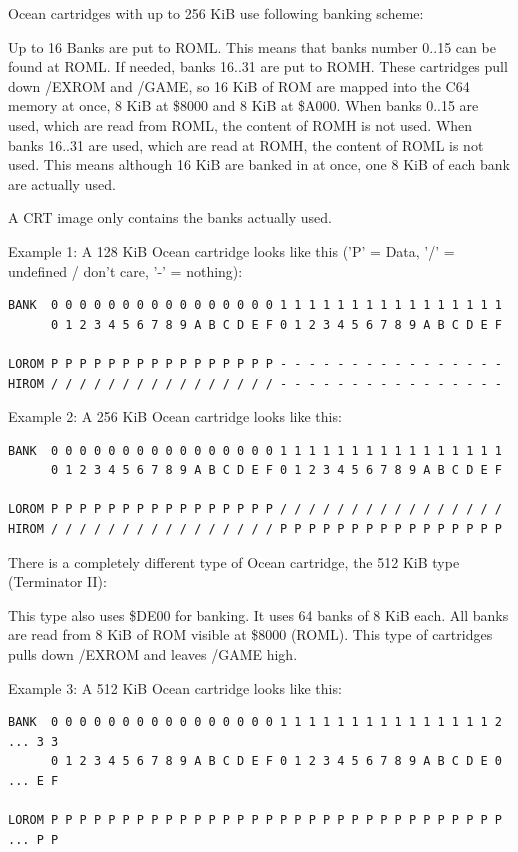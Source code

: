 \documentclass[a4paper,oneside]{memoir}
\begin{document}
Ocean cartridges with up to 256 KiB use following banking scheme:

Up to 16 Banks are put to ROML. This means that banks number 0..15 can be found
at ROML. If needed, banks 16..31 are put to ROMH. These cartridges pull down
/EXROM and /GAME, so 16 KiB of ROM are mapped into the C64 memory at once, 8
KiB at \$8000 and 8 KiB at \$A000.
When banks 0..15 are used, which are read from ROML, the content of ROMH is not
used. When banks 16..31 are used, which are read at ROMH, the content of ROML
is not used. This means although 16 KiB are banked in at once, one 8 KiB of
each bank are actually used.

A CRT image only contains the banks actually used.

Example 1: A 128 KiB Ocean cartridge looks like this ('P' = Data, '/' =
undefined / don't care, '-' = nothing):

\small
\begin{verbatim}
BANK  0 0 0 0 0 0 0 0 0 0 0 0 0 0 0 0 1 1 1 1 1 1 1 1 1 1 1 1 1 1 1 1
      0 1 2 3 4 5 6 7 8 9 A B C D E F 0 1 2 3 4 5 6 7 8 9 A B C D E F

LOROM P P P P P P P P P P P P P P P P - - - - - - - - - - - - - - - -
HIROM / / / / / / / / / / / / / / / / - - - - - - - - - - - - - - - -
\end{verbatim}
\normalsize

Example 2: A 256 KiB Ocean cartridge looks like this:

\small
\begin{verbatim}
BANK  0 0 0 0 0 0 0 0 0 0 0 0 0 0 0 0 1 1 1 1 1 1 1 1 1 1 1 1 1 1 1 1
      0 1 2 3 4 5 6 7 8 9 A B C D E F 0 1 2 3 4 5 6 7 8 9 A B C D E F

LOROM P P P P P P P P P P P P P P P P / / / / / / / / / / / / / / / /
HIROM / / / / / / / / / / / / / / / / P P P P P P P P P P P P P P P P
\end{verbatim}
\normalsize

There is a completely different type of Ocean cartridge, the 512 KiB type
(Terminator II):

This type also uses \$DE00 for banking. It uses 64 banks of 8 KiB each. All
banks are read from 8 KiB of ROM visible at \$8000 (ROML). This type of
cartridges pulls down /EXROM and leaves /GAME high.

Example 3: A 512 KiB Ocean cartridge looks like this:

\footnotesize
\begin{verbatim}
BANK  0 0 0 0 0 0 0 0 0 0 0 0 0 0 0 0 1 1 1 1 1 1 1 1 1 1 1 1 1 1 1 2 ... 3 3
      0 1 2 3 4 5 6 7 8 9 A B C D E F 0 1 2 3 4 5 6 7 8 9 A B C D E 0 ... E F

LOROM P P P P P P P P P P P P P P P P P P P P P P P P P P P P P P P P ... P P
\end{verbatim}
\normalsize
\end{document}
